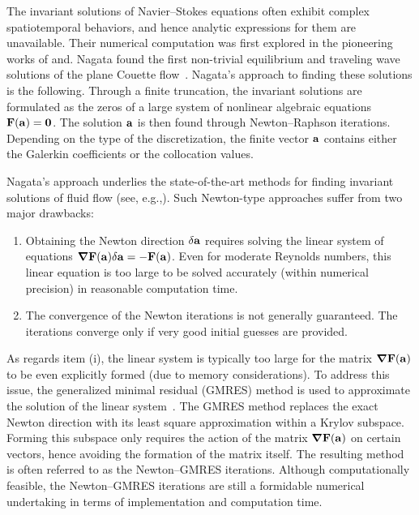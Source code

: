 \documentclass{jfm}
\begin{document}
The invariant solutions of Navier--Stokes equations often exhibit
complex spatiotemporal behaviors, and hence analytic expressions for them
are unavailable. Their numerical computation was first
explored in the pioneering works of and.
Nagata found the first non-trivial equilibrium and traveling wave solutions
of the plane Couette flow~\citep{N90,N97}.
Nagata's approach to finding these solutions is the following.
Through a finite truncation, the invariant solutions are formulated as the zeros of
a large system of nonlinear algebraic equations $\mathbf F(\mathbf a)=\mathbf 0$. The solution $\mathbf a$ is
then found through Newton--Raphson iterations. Depending on the type of the
discretization, the finite vector $\mathbf a$ contains either
the Galerkin coefficients or the collocation values.

Nagata's approach underlies the state-of-the-art methods for finding invariant solutions
of fluid flow
(see, e.g.,). Such Newton-type approaches suffer from two
major drawbacks:
\begin{enumerate}\renewcommand{\theenumi}{\roman{enumi}}
\item Obtaining the Newton direction $\delta\mathbf a$ requires solving the linear system of equations
$\mbox{\boldmath $\nabla$}\mathbf F(\mathbf a)\delta\mathbf a=-\mathbf F(\mathbf a)$.
Even for moderate Reynolds numbers, this linear equation
is too large to be solved accurately (within numerical precision) in reasonable computation time.
\item The convergence of the Newton iterations is not generally guaranteed. The iterations converge
only if very good initial guesses are provided.
\end{enumerate}

As regards item (i), the linear system is typically too large for the
matrix $\mbox{\boldmath $\nabla$}\mathbf F(\mathbf a)$ to be even
explicitly formed (due to memory considerations). To address this issue,
 the generalized minimal residual (GMRES) method is used to
approximate the solution of the linear system~\citep{gmres}. The GMRES method replaces the
exact Newton direction with its least square approximation within a Krylov subspace.
Forming this subspace only requires the action of the matrix $\mbox{\boldmath $\nabla$}\mathbf F(\mathbf a)$ on certain
vectors, hence avoiding the formation of the matrix itself.
The resulting method is often referred to as the Newton--GMRES iterations.
Although computationally feasible, the Newton--GMRES iterations are still
a formidable numerical undertaking in terms of implementation and computation time.
\end{document}
